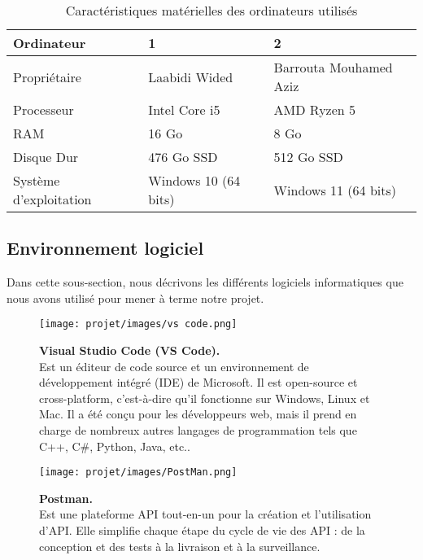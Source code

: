 \begin{table}[H]
\centering
\begin{tabular}{|l|l|l|}
\hline
\textbf{Ordinateur} & \textbf{1} & \textbf{2} \\ \hline
Propriétaire & Laabidi Wided & Barrouta Mouhamed Aziz \\ \hline
Processeur & Intel Core i5 & AMD Ryzen 5 \\ \hline
RAM & 16 Go & 8 Go \\ \hline
Disque Dur & 476 Go SSD & 512 Go SSD \\ \hline
Système d’exploitation & Windows 10 (64 bits) & Windows 11 (64 bits) \\ \hline
\end{tabular}
\caption{Caractéristiques matérielles des ordinateurs utilisés}
\label{tab:environnement_materiel}
\end{table}
\subsection{Environnement logiciel}
Dans cette sous-section, nous décrivons les différents logiciels informatiques
que nous avons utilisé pour mener à terme notre projet.
\begin{figure}[H]
    \centering
    \begin{minipage}[c]{0.3\textwidth}
      \texttt{[image: projet/images/vs code.png]}
    \end{minipage}
    \hspace{1cm}
    \begin{minipage}[c]{0.6\textwidth}
        \textbf{Visual Studio Code (VS Code).}\\
        
       Est un éditeur de code source et un environnement de développement intégré (IDE) de Microsoft. Il est open-source et cross-platform, c’est-à-dire qu’il fonctionne sur Windows, Linux et Mac. Il a été conçu pour les développeurs web, mais il prend en charge de nombreux autres langages de programmation tels que C++, C#, Python, Java, etc..
    \end{minipage}
\end{figure}

\vspace{0.5cm}

\begin{figure}[H]
    \centering
    \begin{minipage}[c]{0.3\textwidth}
        \texttt{[image: projet/images/PostMan.png]}
    \end{minipage}
    \hspace{1cm}
    \begin{minipage}[c]{0.6\textwidth}
        \textbf{Postman.}\\[0.5em]
        Est une plateforme API tout-en-un pour la création et l'utilisation d'API. Elle simplifie chaque étape du cycle de vie des API : de la conception et des tests à la livraison et à la surveillance. \cite{ref5}
    \end{minipage}
\end{figure}

